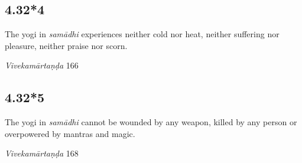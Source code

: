 \begin{ekdosis}
\subsection*{4.32*4}
\begin{translation}[hp04_032_4]
The yogi in \textit{samādhi} experiences neither cold nor heat, neither suffering nor pleasure, neither praise nor scorn.
\end{translation}

\begin{sources}[hp04_032_4]
\emph{Vivekamārtaṇḍa} 166
\begin{versinnote}
\end{versinnote}
\end{sources}



\subsection*{4.32*5}
\begin{translation}[hp04_032_5]
The yogi in \textit{samādhi} cannot be wounded by any weapon, killed by any person or overpowered by mantras and magic.
\end{translation}

\begin{sources}[hp04_032_5]
\emph{Vivekamārtaṇḍa} 168
\begin{versinnote}
\end{versinnote}
\end{sources}




\end{ekdosis}

